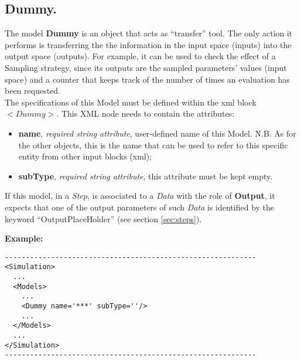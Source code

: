 \subsection{Dummy.}
\label{subsec:models_dummy}
The model \textbf{Dummy} is an object that acts as ``transfer'' tool. The only action it performs is transferring the the information in the input space (inputs) into the output space (outputs). For example, it can be used to check the effect of a Sampling strategy, since its outputs are the sampled parameters' values (input space) and a counter that keeps track of the number of times an evaluation has been requested.
\\ The specifications of this Model must be defined within the xml block $<Dummy>$. This XML node needs to contain the attributes:
\vspace{-5mm}
\begin{itemize}
\itemsep0em
\item \textbf{name}, \textit{required string attribute}, user-defined name of this Model. N.B. As for the other objects, this is the name that can be used to refer to this specific entity from other input blocks (xml);
\item \textbf{subType}, \textit{required string attribute}, this attribute must be kept empty.
\end{itemize}
\vspace{-5mm}
If this model, in a \textit{Step}, is associated to a \textit{Data} with the role of \textbf{Output}, it expects that one of the output parameters of such \textit{Data} is identified by the keyword ``OutputPlaceHolder'' (see section \ref{sec:steps}).

\textbf{Example:}
\begin{lstlisting}[style=XML]
------------------------------------------------------------
<Simulation>
  ...
  <Models>
    ...
    <Dummy name='***' subType=''/>
    ...
  </Models>
  ...
</Simulation>
------------------------------------------------------------
\end{lstlisting}
